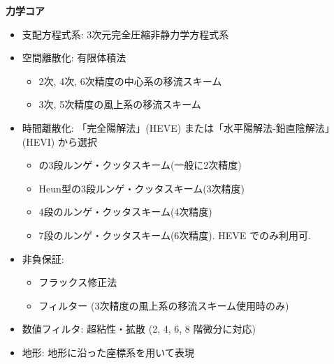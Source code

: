 {\bf 力学コア}
\begin{itemize}
 \item 支配方程式系: 3次元完全圧縮非静力学方程式系
 \item 空間離散化: 有限体積法
    \begin{itemize}
      \item 2次, 4次, 6次精度の中心系の移流スキーム
      \item 3次, 5次精度の風上系の移流スキーム
    \end{itemize}
 \item 時間離散化: 「完全陽解法」(HEVE) または「水平陽解法-鉛直陰解法」(HEVI) から選択
    \begin{itemize}
      \item \citet{Wicker_2002}の3段ルンゲ・クッタスキーム(一般に2次精度)
      \item Heun型の3段ルンゲ・クッタスキーム(3次精度)
      \item 4段のルンゲ・クッタスキーム(4次精度)
      \item 7段のルンゲ・クッタスキーム(6次精度). HEVE でのみ利用可. 
    \end{itemize}
 \item 非負保証:
    \begin{itemize}
      \item フラックス修正法 \citep[Flux Corrected Transport, FCT; ][]{zalesak_1979}
      \item \citet{Koren_1993}フィルター  (3次精度の風上系の移流スキーム使用時のみ)
    \end{itemize}
 \item 数値フィルタ: 超粘性・拡散 (2, 4, 6, 8 階微分に対応)
 \item 地形: 地形に沿った座標系を用いて表現
\end{itemize}

